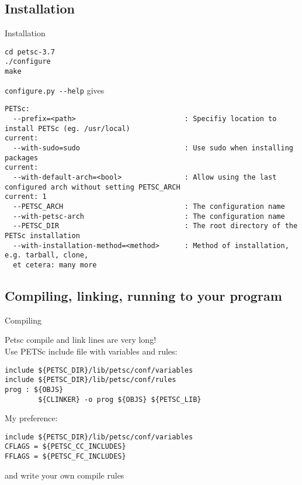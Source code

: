 

\subsection{Installation}

\begin{numberedframe}{Installation}
\begin{verbatim}
cd petsc-3.7
./configure
make
\end{verbatim}
\verb+configure.py --help+ gives

\tiny
\begin{verbatim}
PETSc:
  --prefix=<path>                          : Specifiy location to install PETSc (eg. /usr/local)                                                   current: 
  --with-sudo=sudo                         : Use sudo when installing packages                                                                     current: 
  --with-default-arch=<bool>               : Allow using the last configured arch without setting PETSC_ARCH                                       current: 1
  --PETSC_ARCH                             : The configuration name
  --with-petsc-arch                        : The configuration name
  --PETSC_DIR                              : The root directory of the PETSc installation
  --with-installation-method=<method>      : Method of installation, e.g. tarball, clone,
  et cetera: many more
\end{verbatim}
\end{numberedframe}

\subsection{Compiling, linking, running to your program}

\begin{numberedframe}{Compiling}

Petsc compile and link lines are very long!\\
Use PETSc include file with variables and rules:
\begin{verbatim}
include ${PETSC_DIR}/lib/petsc/conf/variables
include ${PETSC_DIR}/lib/petsc/conf/rules
prog : ${OBJS} 
        ${CLINKER} -o prog ${OBJS} ${PETSC_LIB}
\end{verbatim}
My preference:
\begin{verbatim}
include ${PETSC_DIR}/lib/petsc/conf/variables
CFLAGS = ${PETSC_CC_INCLUDES}
FFLAGS = ${PETSC_FC_INCLUDES}
\end{verbatim}
and write your own compile rules
\end{numberedframe}

